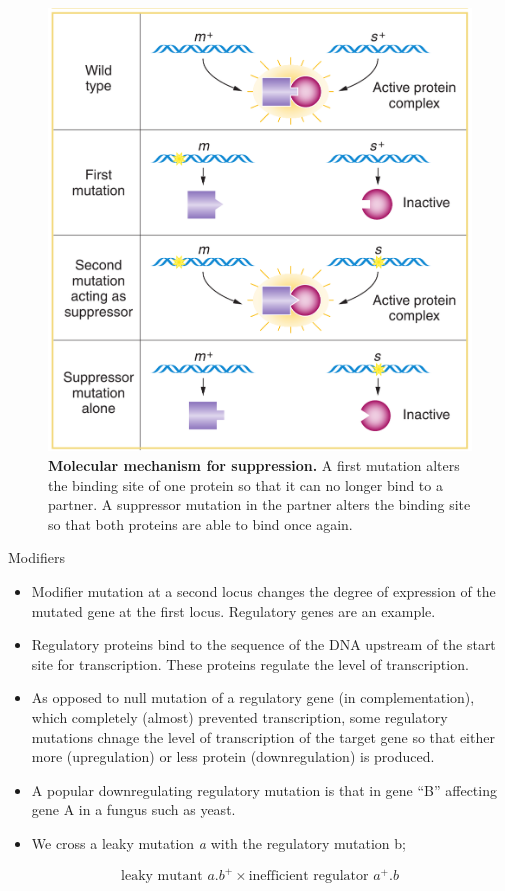 \documentclass[11pt,dvipsnames,ignorenonframetext,aspectratio=169]{beamer}
\providecommand{\tightlist}{%
  \setlength{\itemsep}{0pt}\setlength{\parskip}{0pt}}
\begin{document}
\begin{frame}{}
\protect\hypertarget{section-21}{}
\begin{figure}

{\centering \includegraphics[width=0.4\linewidth]{./../images/molecular_basis_suppression} 

}

\caption{\textbf{Molecular mechanism for suppression.} A first mutation alters the binding site of one protein so that it can no longer bind to a partner. A suppressor mutation in the partner alters the binding site so that both proteins are able to bind once again.}\label{fig:gene-suppression}
\end{figure}
\end{frame}

\begin{frame}{Modifiers}
\protect\hypertarget{modifiers}{}
\begin{itemize}
\tightlist
\item
  Modifier mutation at a second locus changes the degree of expression
  of the mutated gene at the first locus. Regulatory genes are an
  example.
\item
  Regulatory proteins bind to the sequence of the DNA upstream of the
  start site for transcription. These proteins regulate the level of
  transcription.
\item
  As opposed to null mutation of a regulatory gene (in complementation),
  which completely (almost) prevented transcription, some regulatory
  mutations chnage the level of transcription of the target gene so that
  either more (upregulation) or less protein (downregulation) is
  produced.
\item
  A popular downregulating regulatory mutation is that in gene ``B''
  affecting gene A in a fungus such as yeast.
\item
  We cross a leaky mutation \emph{a} with the regulatory mutation b;
\end{itemize}

\[
\textrm{leaky mutant } a.b^+ \times \textrm{inefficient regulator } a^+.b
\]
\end{frame}
\end{document}

